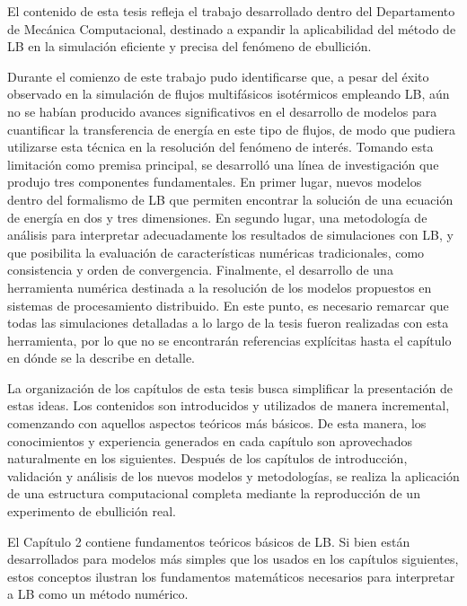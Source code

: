 El contenido de esta tesis refleja el trabajo desarrollado dentro del Departamento de Mec\'anica Computacional, destinado a expandir la aplicabilidad del m\'etodo de LB en la simulaci\'on eficiente y precisa del fen\'omeno de ebullici\'on.

Durante el comienzo de este trabajo pudo identificarse que, a pesar del \'exito observado en la simulaci\'on de flujos multif\'asicos isot\'ermicos empleando LB, a\'un no se hab\'ian producido avances significativos en el desarrollo de modelos para cuantificar la transferencia de energ\'ia en este tipo de flujos, de modo que pudiera utilizarse esta t\'ecnica en la resoluci\'on del fen\'omeno de inter\'es. Tomando esta limitaci\'on como premisa principal, se desarroll\'o una l\'inea de investigaci\'on que produjo tres componentes fundamentales. En primer lugar, nuevos modelos dentro del formalismo de LB que permiten encontrar la soluci\'on de una ecuaci\'on de energ\'ia en dos y tres dimensiones. En segundo lugar, una metodolog\'ia de an\'alisis para interpretar adecuadamente los resultados de simulaciones con LB, y que posibilita la evaluaci\'on de caracter\'isticas num\'ericas tradicionales, como consistencia y orden de convergencia. Finalmente, el desarrollo de una herramienta num\'erica destinada a la resoluci\'on de los modelos propuestos en sistemas de procesamiento distribuido. En este punto, es necesario remarcar que todas las simulaciones detalladas a lo largo de la tesis fueron realizadas con esta herramienta, por lo que no se encontrar\'an referencias expl\'icitas hasta el cap\'itulo en d\'onde se la describe en detalle. 

La organizaci\'on de los cap\'itulos de esta tesis busca simplificar la presentaci\'on de estas ideas. Los contenidos son introducidos y utilizados de manera incremental, comenzando con aquellos aspectos te\'oricos m\'as b\'asicos. De esta manera, los conocimientos y experiencia generados en cada cap\'itulo son aprovechados  naturalmente en los siguientes. Despu\'es de los cap\'itulos de introducci\'on, validaci\'on y an\'alisis de los nuevos modelos y metodolog\'ias, se realiza la aplicaci\'on de una estructura computacional completa mediante la reproducci\'on de un experimento de ebullici\'on real.

El Cap\'itulo 2 contiene fundamentos te\'oricos b\'asicos de LB. Si bien est\'an desarrollados para modelos m\'as simples que los usados en los cap\'itulos siguientes, estos conceptos ilustran los fundamentos matem\'aticos necesarios para interpretar a LB como un m\'etodo num\'erico.

